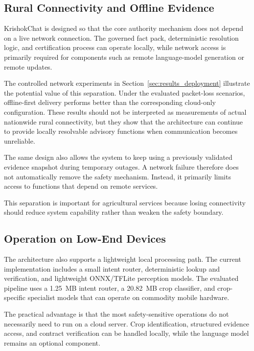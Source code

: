 \documentclass[a4paper,fleqn]{cas-dc}
\begin{document}
\subsection{Rural Connectivity and Offline Evidence}

KrishokChat is designed so that the core authority mechanism does not depend on a live network connection. The governed fact pack, deterministic resolution logic, and certification process can operate locally, while network access is primarily required for components such as remote language-model generation or remote updates.

The controlled network experiments in Section~\ref{sec:results_deployment} illustrate the potential value of this separation. Under the evaluated packet-loss scenarios, offline-first delivery performs better than the corresponding cloud-only configuration. These results should not be interpreted as measurements of actual nationwide rural connectivity, but they show that the architecture can continue to provide locally resolvable advisory functions when communication becomes unreliable. 

The same design also allows the system to keep using a previously validated evidence snapshot during temporary outages. A network failure therefore does not automatically remove the safety mechanism. Instead, it primarily limits access to functions that depend on remote services.

This separation is important for agricultural services because losing connectivity should reduce system capability rather than weaken the safety boundary.

\subsection{Operation on Low-End Devices}

The architecture also supports a lightweight local processing path. The current implementation includes a small intent router, deterministic lookup and verification, and lightweight ONNX/TFLite perception models. The evaluated pipeline uses a 1.25~MB intent router, a 20.82~MB crop classifier, and crop-specific specialist models that can operate on commodity mobile hardware. 

The practical advantage is that the most safety-sensitive operations do not necessarily need to run on a cloud server. Crop identification, structured evidence access, and contract verification can be handled locally, while the language model remains an optional component.
\end{document}
